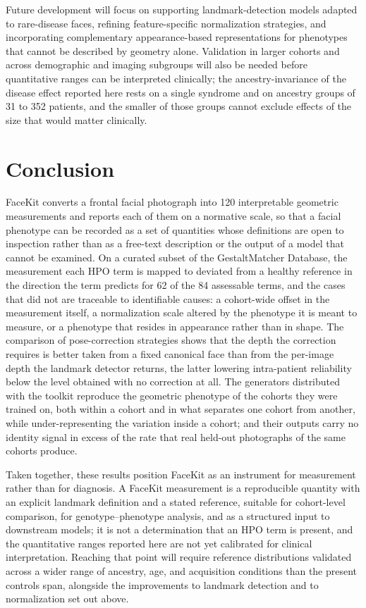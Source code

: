 \documentclass[11pt]{article}
\begin{document}
Future development will focus on supporting landmark-detection models adapted to rare-disease faces, refining feature-specific normalization strategies, and incorporating complementary appearance-based representations for phenotypes that cannot be described by geometry alone. Validation in larger cohorts and across demographic and imaging subgroups will also be needed before quantitative ranges can be interpreted clinically; the ancestry-invariance of the disease effect reported here rests on a single syndrome and on ancestry groups of 31 to 352 patients, and the smaller of those groups cannot exclude effects of the size that would matter clinically.

\section{Conclusion}

FaceKit converts a frontal facial photograph into 120 interpretable geometric
measurements and reports each of them on a normative scale, so that a facial
phenotype can be recorded as a set of quantities whose definitions are open to
inspection rather than as a free-text description or the output of a model that
cannot be examined. On a curated subset of the GestaltMatcher Database, the
measurement each HPO term is mapped to deviated from a healthy reference in the
direction the term predicts for 62 of the 84 assessable terms, and the cases
that did not are traceable to identifiable causes: a cohort-wide offset in the
measurement itself, a normalization scale altered by the phenotype it is meant
to measure, or a phenotype that resides in appearance rather than in shape. The
comparison of pose-correction strategies shows that the depth the correction
requires is better taken from a fixed canonical face than from the per-image
depth the landmark detector returns, the latter lowering intra-patient
reliability below the level obtained with no correction at all. The generators
distributed with the toolkit reproduce the geometric phenotype of the cohorts
they were trained on, both within a cohort and in what separates one cohort from
another, while under-representing the variation inside a cohort; and their
outputs carry no identity signal in excess of the rate that real held-out
photographs of the same cohorts produce.

Taken together, these results position FaceKit as an instrument for measurement
rather than for diagnosis. A FaceKit measurement is a reproducible quantity with
an explicit landmark definition and a stated reference, suitable for
cohort-level comparison, for genotype--phenotype analysis, and as a structured
input to downstream models; it is not a determination that an HPO term is
present, and the quantitative ranges reported here are not yet calibrated for
clinical interpretation. Reaching that point will require reference
distributions validated across a wider range of ancestry, age, and acquisition
conditions than the present controls span, alongside the improvements to
landmark detection and to normalization set out above.



\end{document}

